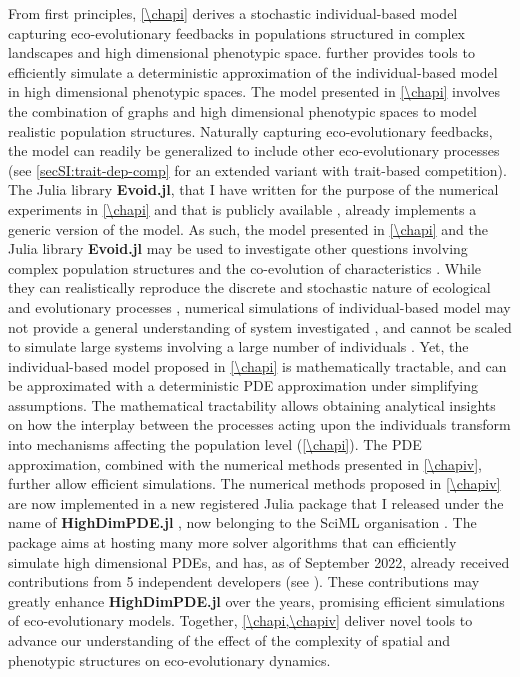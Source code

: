 From first principles, \cref{\chapi} derives a stochastic individual-based model capturing eco-evolutionary feedbacks in populations structured in complex landscapes and high dimensional phenotypic space. \Cref{\chapiv} further provides tools to efficiently simulate a deterministic approximation of the individual-based model in high dimensional phenotypic spaces.
% 
The model presented in \cref{\chapi} involves the combination of graphs and high dimensional phenotypic spaces to model realistic population structures. Naturally capturing eco-evolutionary feedbacks, the model can readily be generalized to include other eco-evolutionary processes (see \cref{secSI:trait-dep-comp} for an extended variant with trait-based competition). The Julia library \textbf{Evoid.jl}, that I have written for the purpose of the numerical experiments in \cref{\chapi} and that is publicly available \citep{Evoid}, already implements a generic version of the model. %
% 
As such, the model presented in \cref{\chapi} and the Julia library \textbf{Evoid.jl} may be used to investigate other questions involving complex population structures \citep{LiebermanHauert2005} and the co-evolution of characteristics \citep{Doebeli2011}.
% 
While they can realistically reproduce the discrete and stochastic nature of ecological and evolutionary processes \citep{deangelis2005individual}, numerical simulations of individual-based model may not provide a general understanding of system investigated \citep{Lion2016,Hodgson2019}, and cannot be scaled to simulate large systems involving a large number of individuals \citep{deangelis2005individual}. Yet, the individual-based model proposed in \cref{\chapi} is mathematically tractable, and can be approximated with a deterministic PDE approximation under simplifying assumptions.
% 
The mathematical tractability allows obtaining analytical insights on how the interplay between the processes acting upon the individuals transform into mechanisms affecting the population level (\cref{\chapi}).
% 
The PDE approximation, combined with the numerical methods presented in \cref{\chapiv}, further allow efficient simulations. 
% 
The numerical methods proposed in \cref{\chapiv} are now implemented in a new registered Julia package that I released under the name of \textbf{HighDimPDE.jl} \citep{HighDimPDE}, now belonging to the SciML organisation \citep{Rackauckas2020a}.
%
The package aims at hosting many more solver algorithms that can efficiently simulate high dimensional PDEs, and has, as of September 2022, already received contributions from 5 independent developers (see \cite{contribHighDimPDE}). These contributions may greatly enhance \textbf{HighDimPDE.jl} over the years, promising efficient simulations of eco-evolutionary models.
% 
Together, \cref{\chapi,\chapiv} deliver novel tools to advance our understanding of the effect of the complexity of spatial and phenotypic structures on eco-evolutionary dynamics.


